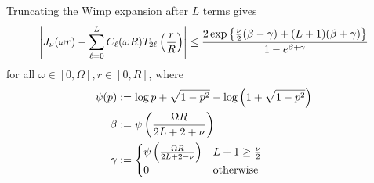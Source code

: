\begin{lemma} \label{lem:wimp} Truncating the Wimp expansion after $L$ terms
    gives
    \begin{align}
        \left|J_\nu(\omega r) - \sum_{\ell=0}^L C_\ell(\omega R) T_{2\ell}\left( \frac{r}{R} \right)\right| 
        \leq \frac{2\exp\left\{ \frac{\nu}{2}(\beta - \gamma) + (L+1)(\beta + \gamma) \right\}}{1 - e^{\beta + \gamma}}
    \end{align}
    for all $\omega \in [0, \Omega], r \in [0, R]$, where
    \begin{align}
        \psi(p) &:= \log p + \sqrt{1 - p^2} - \log\left( 1 + \sqrt{1 - p^2} \right) \\
        \beta &:= \psi\left( \frac{\Omega R}{2L + 2 + \nu} \right) \\
        \gamma &:= \begin{cases}
            \psi\left( \frac{\Omega R}{2L + 2 - \nu} \right) & L + 1 \geq \frac{\nu}{2} \\
            0 & \textnormal{otherwise}
        \end{cases}
    \end{align}
\end{lemma}
